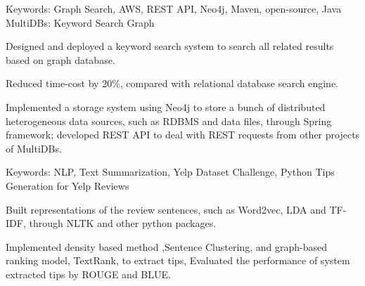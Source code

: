 \begin{cventries}
 
 
    \cventry
    {Keywords: Graph Search, AWS, REST API, Neo4j, Maven, open-source, Java} %
    {MultiDBs: Keyword Search Graph} %
    {} %
    {} 
    {
      \begin{cvitems}
      	\item {Designed and deployed a keyword search system to search all related results based on graph database.}
        \item {Reduced time-cost by 20\%, compared with relational database search engine.}
        \item {Implemented a storage system using Neo4j to store a bunch of distributed heterogeneous data sources, such as RDBMS and data files, through Spring framework; developed REST API to deal with REST requests from other projects of MultiDBs.}
      \end{cvitems}
    }
    
  \cventry
    {Keywords: NLP, Text Summarization, Yelp Dataset Challenge, Python}  %
    {Tips Generation for Yelp Reviews} %
    {} %
    {}
    {
      \begin{cvitems}
        \item {Built representations of the review sentences, such as Word2vec, LDA and TF-IDF, through NLTK and other python packages.}
        \item {Implemented density based method ,Sentence Clustering, and graph-based ranking model, TextRank, to extract tips, Evaluated the performance of system extracted tips by ROUGE and BLUE.}
      \end{cvitems}
    }




\end{cventries}
